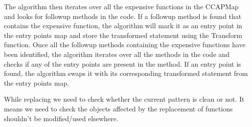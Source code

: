 The algorithm then iterates over all the expensive functions in the CCAPMap and looks for followup methods in the code. If a followup method is found that contains the expensive function, the algorithm will mark it as an entry point in the entry points map and store the transformed statement using the Transform function. Once all the followup methods containing the expensive functions have been identified, the algorithm iterates over all the methods in the code and checks if any of the entry points are present in the method. If an entry point is found, the algorithm swaps it with its corresponding transformed statement from the entry points map.


While replacing we need to check whether the current pattern is clean or not. It means we need to check the objects affected by the replacement of functions shouldn't be modified/used elsewhere.
